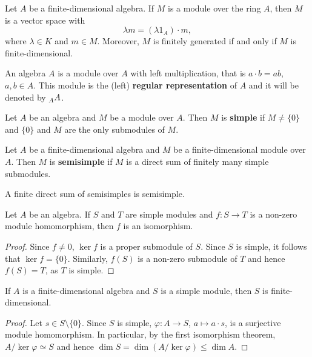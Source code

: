 Let $A$ be a finite-dimensional algebra. 
If $M$ is a module over the ring $A$, then $M$ is a vector space with  
\[
\lambda m=(\lambda 1_A)\cdot m, 
\]
where $\lambda\in K$ and $m\in M$. Moreover, $M$ is finitely generated if and only if $M$ is finite-dimensional.  


\begin{example}
An algebra  $A$ is a module over $A$ with left multiplication, that is $a\cdot b=ab$, $a,b\in A$.
This module is the (left) \textbf{regular representation} of $A$ and it will be denoted by $\prescript{}{A}{A}$. 
\end{example}

\begin{definition}
	Let $A$ be an algebra and $M$ be a module over $A$. Then 
	$M$ is \textbf{simple} if $M\ne\{0\}$ and $\{0\}$ and $M$ 
	are the only submodules of $M$.	
\end{definition}

\begin{definition}
	Let $A$ be a finite-dimensional 
	algebra and $M$ be a finite-dimensional module over $A$. Then 
	$M$ is \textbf{semisimple} if $M$ is a direct sum of 
	finitely many simple submodules.  
\end{definition}

A finite direct sum of semisimples is semisimple. 

\begin{lemma}[Schur]
	Let $A$ be an algebra. If $S$ and $T$ are
	simple modules and $f\colon S\to T$ is a non-zero module homomorphism, 
	then $f$ is an isomorphism. 
\end{lemma}

\begin{proof}
Since $f\ne 0$, $\ker f$ is a proper submodule of $S$. Since $S$ is simple, it follows 
that $\ker f=\{0\}$. Similarly, $f(S)$ 
is a non-zero submodule of $T$ and hence $f(S)=T$, as $T$ is simple. 	
\end{proof}

\begin{proposition}
    If $A$ is a finite-dimensional algebra and $S$ is a simple module, then $S$ is finite-dimensional. 
\end{proposition}

\begin{proof}
    Let $s\in S\setminus\{0\}$. Since $S$ is simple, $\varphi\colon A\to S$, $a\mapsto a\cdot s$, is a surjective 
    module homomorphism. 
    In particular, by the first isomorphism theorem, $A/\ker\varphi\simeq S$ and hence $\dim S=\dim (A/\ker\varphi)\leq \dim A$. 
\end{proof}

